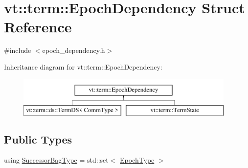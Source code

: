 \hypertarget{structvt_1_1term_1_1_epoch_dependency}{}\section{vt\+:\+:term\+:\+:Epoch\+Dependency Struct Reference}
\label{structvt_1_1term_1_1_epoch_dependency}


{\ttfamily \#include $<$epoch\+\_\+dependency.\+h$>$}

Inheritance diagram for vt\+:\+:term\+:\+:Epoch\+Dependency\+:\begin{figure}[H]
\begin{center}
\leavevmode
\includegraphics[height=2.000000cm]{structvt_1_1term_1_1_epoch_dependency}
\end{center}
\end{figure}
\subsection*{Public Types}
\begin{DoxyCompactItemize}
\item 
using \hyperlink{structvt_1_1term_1_1_epoch_dependency_a3f00b47c33158f3241ebbeb0a0cb7b1d}{Successor\+Bag\+Type} = std\+::set$<$ \hyperlink{namespacevt_a985a5adf291c34a3ca263b3378388236}{Epoch\+Type} $>$
\end{DoxyCompactItemize}
